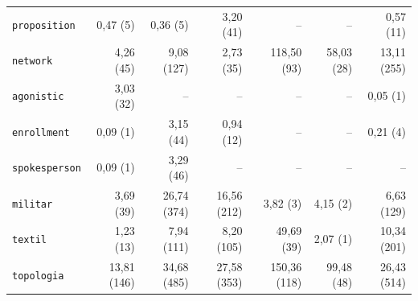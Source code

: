 \begin{table}[htbp]
\begin{tabular}{lrrrrrr}
\texttt{proposition} & 0{,}47 (5) & 0{,}36 (5) & 3{,}20 (41) & -- & -- & 0{,}57 (11) \\
\texttt{network} & 4{,}26 (45) & 9{,}08 (127) & 2{,}73 (35) & 118{,}50 (93) & 58{,}03 (28) & 13{,}11 (255) \\
\texttt{agonistic} & 3{,}03 (32) & -- & -- & -- & -- & 0{,}05 (1) \\
\texttt{enrollment} & 0{,}09 (1) & 3{,}15 (44) & 0{,}94 (12) & -- & -- & 0{,}21 (4) \\
\texttt{spokesperson} & 0{,}09 (1) & 3{,}29 (46) & -- & -- & -- & -- \\
\texttt{militar} & 3{,}69 (39) & 26{,}74 (374) & 16{,}56 (212) & 3{,}82 (3) & 4{,}15 (2) & 6{,}63 (129) \\
\texttt{textil} & 1{,}23 (13) & 7{,}94 (111) & 8{,}20 (105) & 49{,}69 (39) & 2{,}07 (1) & 10{,}34 (201) \\
\texttt{topologia} & 13{,}81 (146) & 34{,}68 (485) & 27{,}58 (353) & 150{,}36 (118) & 99{,}48 (48) & 26{,}43 (514) \\
\bottomrule
\end{tabular}
\end{table}

